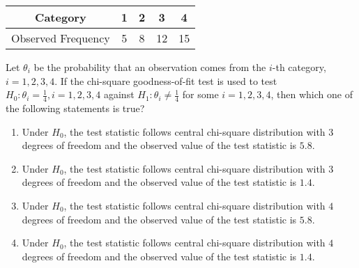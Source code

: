 \begin{tabular}{|c|c|c|c|c|}
\hline
Category & 1 & 2 & 3 & 4 \\
\hline
Observed Frequency & 5 & 8 & 12 & 15 \\
\hline
\end{tabular}

Let $\theta_i$ be the probability that an observation comes from the $i$-th category, $i = 1, 2, 3, 4$. If the chi-square goodness-of-fit test is used to test $H_0: \theta_i = \frac{1}{4}, i = 1, 2, 3, 4$ against $H_1: \theta_i \neq \frac{1}{4}$ for some $i = 1, 2, 3, 4$, then which one of the following statements is true?

\begin{enumerate}
    \item Under $H_0$, the test statistic follows central chi-square distribution with $3$ degrees of freedom and the observed value of the test statistic is $5.8$.
    \item Under $H_0$, the test statistic follows central chi-square distribution with $3$ degrees of freedom and the observed value of the test statistic is $1.4$.
    \item Under $H_0$, the test statistic follows central chi-square distribution with $4$ degrees of freedom and the observed value of the test statistic is $5.8$.
    \item Under $H_0$, the test statistic follows central chi-square distribution with $4$ degrees of freedom and the observed value of the test statistic is $1.4$.
\end{enumerate}

